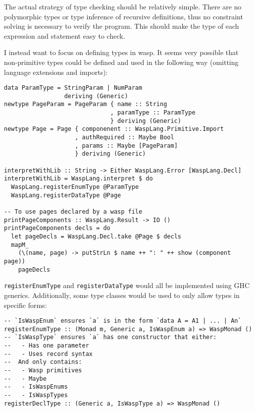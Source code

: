 The actual strategy of type checking should be relatively simple. There are no
polymorphic types or type inference of recursive definitions, thus no constraint
solving is necessary to verify the program. This should make the type of each
expression and statement easy to check.

I instead want to focus on defining types in wasp. It seems very possible that
non-primitive types could be defined and used in the following way (omitting
language extensions and imports):

\begin{minipage}{\linewidth}
\begin{lstlisting}
data ParamType = StringParam | NumParam
                 deriving (Generic)
newtype PageParam = PageParam { name :: String
                              , paramType :: ParamType
                              } deriving (Generic)
newtype Page = Page { componenent :: WaspLang.Primitive.Import
                    , authRequired :: Maybe Bool
                    , params :: Maybe [PageParam]
                    } deriving (Generic)

interpretWithLib :: String -> Either WaspLang.Error [WaspLang.Decl]
interpretWithLib = WaspLang.interpret $ do
  WaspLang.registerEnumType @ParamType
  WaspLang.registerDataType @Page

-- To use pages declared by a wasp file
printPageComponents :: WaspLang.Result -> IO ()
printPageComponents decls = do
  let pageDecls = WaspLang.Decl.take @Page $ decls
  mapM_
    (\(name, page) -> putStrLn $ name ++ ": " ++ show (component page))
    pageDecls
\end{lstlisting}
\end{minipage}

\texttt{registerEnumType} and \texttt{registerDataType} would all be
implemented using GHC generics. Additionally, some type classes would be used
to only allow types in specific forms:

\begin{minipage}{\linewidth}
\begin{lstlisting}
-- `IsWaspEnum` ensures `a` is in the form `data A = A1 | ... | An`
registerEnumType :: (Monad m, Generic a, IsWaspEnum a) => WaspMonad ()
-- `IsWaspType` ensures `a` has one constructor that either:
--   - Has one parameter
--   - Uses record syntax
--  And only contains:
--   - Wasp primitives
--   - Maybe
--   - IsWaspEnums
--   - IsWaspTypes
registerDeclType :: (Generic a, IsWaspType a) => WaspMonad ()
\end{lstlisting}
\end{minipage}

